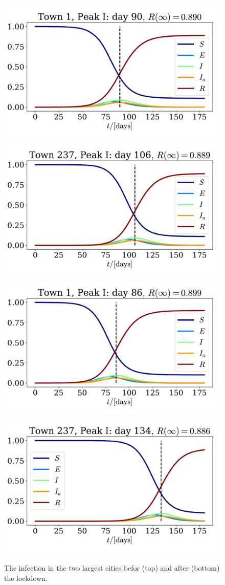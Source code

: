 \documentclass{article}
\begin{document}
    \begin{figure}[H]
        \centering
        \includegraphics[width=.4\textwidth]{../plots/2D/Oslo.pdf}
        \includegraphics[width=.4\textwidth]{../plots/2D/Bergen.pdf}
        \includegraphics[width=.4\textwidth]{../plots/2D/Oslolockdown.pdf}
        \includegraphics[width=.4\textwidth]{../plots/2D/Bergenlockdown.pdf}
        \caption{The infection in the two largest cities befor (top) and after (bottom) the lockdown.}
        \label{Oslo Bergen}
    \end{figure}
    
\end{document}
